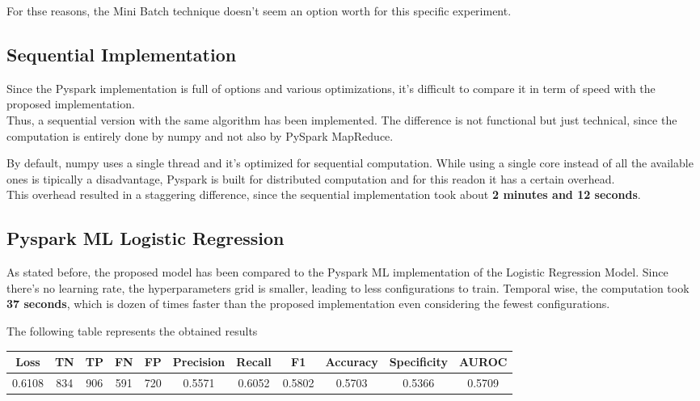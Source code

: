 \documentclass[
	letterpaper, %
	10pt, %
]{class}
\begin{document}
For thse reasons, the Mini Batch technique doesn't seem an option worth for this specific experiment.

\subsection{Sequential Implementation}

Since the Pyspark implementation is full of options and various optimizations, it's difficult to compare it in term of speed with the proposed implementation.\\
Thus, a sequential version with the same algorithm has been implemented. The difference is not functional but just technical, since the computation is entirely done by numpy and not also by PySpark MapReduce.

By default, numpy uses a single thread and it's optimized for sequential computation. While using a single core instead of all the available ones is tipically a disadvantage, Pyspark is built for distributed computation and for this readon it has a certain overhead.\\
This overhead resulted in a staggering difference, since the sequential implementation took about \textbf{2 minutes and 12 seconds}.

\subsection{Pyspark ML Logistic Regression}

As stated before, the proposed model has been compared to the Pyspark ML implementation of the Logistic Regression Model.
Since there's no learning rate, the hyperparameters grid is smaller, leading to less configurations to train.
Temporal wise, the computation took \textbf{37 seconds}, which is dozen of times faster than the proposed implementation even considering the fewest configurations.

The following table represents the obtained results

\begin{center}
    \begin{tabular}{ |c|c|c|c|c|c|c|c|c|c|c| }
        \hline
        Loss   & TN  & TP  & FN  & FP  & Precision & Recall & F1     & Accuracy & Specificity & AUROC  \\
        \hline
        0.6108 & 834 & 906 & 591 & 720 & 0.5571    & 0.6052 & 0.5802 & 0.5703   & 0.5366      & 0.5709 \\
        \hline
    \end{tabular}
\end{center}
\end{document}
